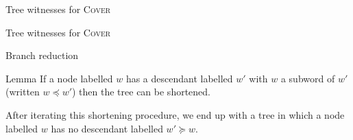 \documentclass{beamer}
\newcommand{\COVER}{\textsc{Cover}}
\begin{document}

	

\begin{frame}{Tree witnesses for \COVER{}}
	
	\centering
	
	
\end{frame}

\begin{frame}{Tree witnesses for \COVER{}}
	\centering
	
	
\end{frame}

\begin{frame}{Branch reduction}
	
	\begin{block}{Lemma}
		If a node labelled $w$ has a descendant labelled $w'$ with $w$ a subword of $w'$ (written $w \preceq w'$) then the tree can be shortened.
	\end{block}
	\begin{center}
	
	\end{center}
	\pause \pause \pause
	\vspace{-1cm}
	
	After iterating this shortening procedure, we end up with a tree in which a node labelled $w$ has no descendant labelled $w' \succeq w$. 
\end{frame}
\end{document}
